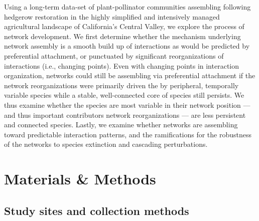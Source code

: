 \documentclass[12pt]{article}
\begin{document}
Using a long-term data-set of plant-pollinator communities assembling
following hedgerow restoration in the highly simplified and
intensively managed agricultural landscape of California's Central
Valley, we explore the process of network development. We first
determine whether the mechanism underlying network assembly is a
smooth build up of interactions as would be predicted by preferential
attachment, or punctuated by significant reorganizations of
interactions (i.e., changing points). Even with changing points in
interaction organization, networks could still be assembling via
preferential attachment if the network reorganizations were primarily
driven the by peripheral, temporally variable species while a stable,
well-connected core of species still persists. We thus examine whether
the species are most variable in their network position --- and thus
important contributors network reorganizations --- are less persistent
and connected species.  Lastly, we examine whether networks are
assembling toward predictable interaction patterns, and the
ramifications for the robustness of the networks to species extinction
and cascading perturbations.


\section*{Materials \& Methods}
\label{sec:methods}

\subsection*{Study sites and collection methods}
\label{sec:study-sites}
\end{document}
